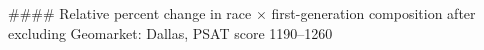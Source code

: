 #### Relative percent change in race × first-generation composition after excluding Geomarket: Dallas, PSAT score 1190–1260
